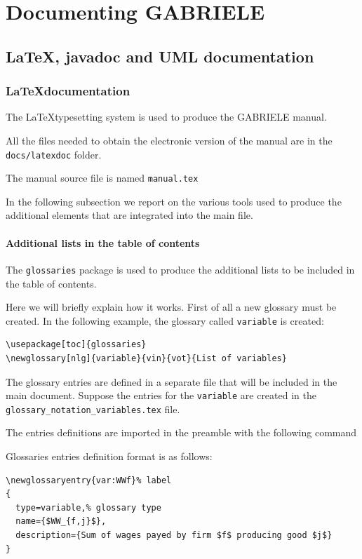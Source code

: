 \documentclass{book}
\begin{document}
\fi

\part{Documenting GABRIELE}


\chapter{\LaTeX, javadoc and UML documentation}
\section{\LaTeX documentation}
The \LaTeX typesetting system is used to produce the GABRIELE manual.

All the files needed to obtain the electronic version of the manual are in the \verb+docs/latexdoc+ folder.

The manual source file is named \verb+manual.tex+

In the following subsection we report on the various tools used to produce the additional elements that are integrated into the main file. 

\subsection{Additional lists in the table of contents}
The \verb+glossaries+ package is used to produce the additional lists to be included in the table of contents.

Here we will briefly explain how it works. First of all a new glossary must be created. In the following example, the glossary called \verb+variable+ is created: 

\begin{verbatim}
\usepackage[toc]{glossaries}
\newglossary[nlg]{variable}{vin}{vot}{List of variables}
\end{verbatim}

The glossary entries are defined in a separate file that will be included in the main document. Suppose the entries for the \verb+variable+ are created in the \verb+glossary_notation_variables.tex+ file. 

The entries definitions are imported in the preamble with the following command\\
\verb++

Glossaries entries definition format is as follows:

\begin{verbatim}
\newglossaryentry{var:WWf}% label 
{ 
  type=variable,% glossary type 
  name={$WW_{f,j}$}, 
  description={Sum of wages payed by firm $f$ producing good $j$} 
}
\end{verbatim}
\end{document}
